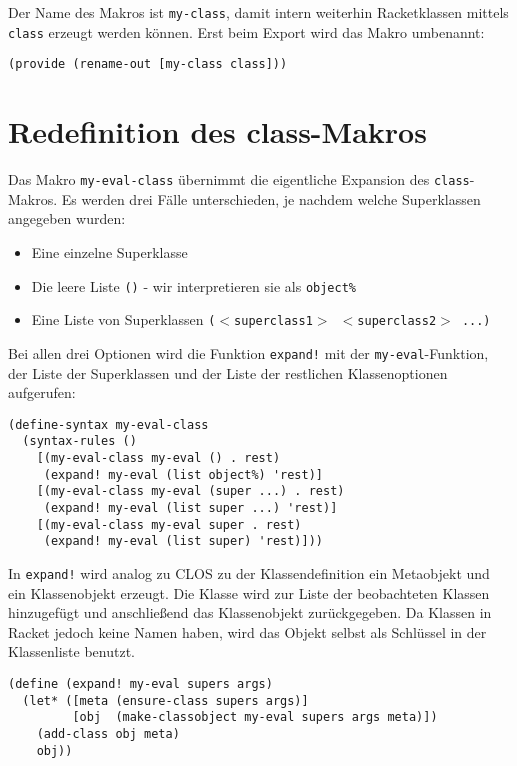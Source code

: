 Der Name des Makros ist \texttt{my-class}, damit intern weiterhin Racketklassen mittels \texttt{class} erzeugt werden können. Erst beim Export wird das Makro umbenannt:

\begin{lstlisting}
(provide (rename-out [my-class class]))
\end{lstlisting}

\section{Redefinition des class-Makros}
Das Makro \texttt{my-eval-class} übernimmt die eigentliche Expansion des \texttt{class}-Makros. Es werden drei Fälle unterschieden, je nachdem welche Superklassen angegeben wurden:
\begin{itemize}
 \item Eine einzelne Superklasse 
 \item Die leere Liste \texttt{()} - wir interpretieren sie als \texttt{object\%}
 \item Eine Liste von Superklassen \texttt{($<$superclass1$>$ $<$superclass2$>$ ...)}
\end{itemize}

Bei allen drei Optionen wird die Funktion \texttt{expand!} mit der \texttt{my-eval}-Funktion, der Liste der Superklassen und der Liste der restlichen Klassenoptionen aufgerufen:

\begin{lstlisting}
(define-syntax my-eval-class
  (syntax-rules ()
    [(my-eval-class my-eval () . rest) 
     (expand! my-eval (list object%) 'rest)]
    [(my-eval-class my-eval (super ...) . rest)
     (expand! my-eval (list super ...) 'rest)]
    [(my-eval-class my-eval super . rest)
     (expand! my-eval (list super) 'rest)]))
\end{lstlisting}

In \texttt{expand!} wird analog zu CLOS zu der Klassendefinition ein Metaobjekt und ein Klassenobjekt erzeugt. Die Klasse wird zur Liste der beobachteten Klassen hinzugefügt und anschließend das Klassenobjekt zurückgegeben. Da Klassen in Racket jedoch keine Namen haben, wird das Objekt selbst als Schlüssel in der Klassenliste benutzt.

\begin{lstlisting}
(define (expand! my-eval supers args)
  (let* ([meta (ensure-class supers args)]
         [obj  (make-classobject my-eval supers args meta)])
    (add-class obj meta)
    obj))
\end{lstlisting}

